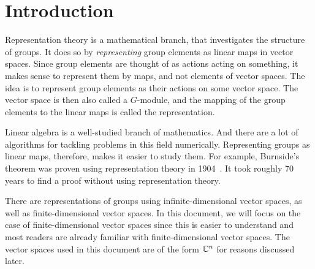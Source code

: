\section{Introduction}

Representation theory is a mathematical branch, that investigates the structure of groups.
It does so by \textit{representing} group elements as linear maps in vector spaces.
Since group elements are thought of as actions acting on something, it makes sense to represent them by maps, and not elements of vector spaces.
The idea is to represent group elements as their actions on some vector space.
The vector space is then also called a $G$-module, and the mapping of the group elements to the linear maps is called the representation.

Linear algebra is a well-studied branch of mathematics.
And there are a lot of algorithms for tackling problems in this field numerically.
Representing groups as linear maps, therefore, makes it easier to study them.
For example, Burnside's theorem was proven using representation theory in 1904~\cite{burnside1904groups}.
It took roughly 70 years to find a proof without using representation theory.

There are representations of groups using infinite-dimensional vector spaces, as well as finite-dimensional vector spaces.
In this document, we will focus on the case of finite-dimensional vector spaces since this is easier to understand and most readers are already familiar with finite-dimensional vector spaces.
The vector spaces used in this document are of the form $\mathbb{C}^n$ for reasons discussed later.
